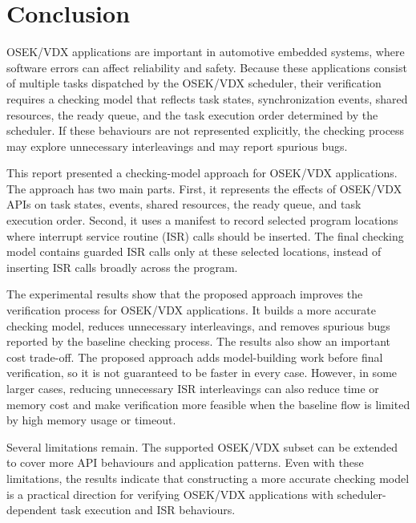\section{Conclusion}
\label{sec:conclusion}

OSEK/VDX applications are important in automotive embedded systems, where software errors can
affect reliability and safety. Because these applications consist of multiple tasks dispatched
by the OSEK/VDX scheduler, their verification requires a checking model that reflects task
states, synchronization events, shared resources, the ready queue, and the task execution order
determined by the scheduler. If these behaviours are not represented explicitly, the checking
process may explore unnecessary interleavings and may report spurious bugs.

This report presented a checking-model approach for OSEK/VDX applications. The approach has
two main parts. First, it represents the effects of OSEK/VDX APIs on task states, events,
shared resources, the ready queue, and task execution order. Second, it uses a manifest to
record selected program locations where interrupt service routine (ISR) calls should be
inserted. The final checking model contains guarded ISR calls only at these selected
locations, instead of inserting ISR calls broadly across the program.

The experimental results show that the proposed approach improves the verification process for
OSEK/VDX applications. It builds a more accurate checking model, reduces unnecessary
interleavings, and removes spurious bugs reported by the baseline checking process. The results
also show an important cost trade-off. The proposed approach adds model-building work before
final verification, so it is not guaranteed to be faster in every case. However, in some larger
cases, reducing unnecessary ISR interleavings can also reduce time or memory cost and make
verification more feasible when the baseline flow is limited by high memory usage or timeout.

Several limitations remain. The supported OSEK/VDX subset can be extended to cover more API behaviours and application patterns. Even with these limitations, the
results indicate that constructing a more accurate checking model is a practical direction for verifying OSEK/VDX applications with scheduler-dependent task execution and ISR behaviours.
